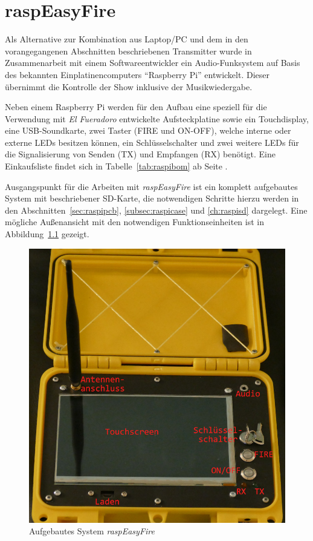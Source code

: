 \documentclass[paper=a4, parskip, numbers=noenddot, toc=listof, headsepline]{scrbook}
\newcommand{\anlage}{\emph{El Fueradoro}}
\newcommand{\REF}{\emph{raspEasyFire}}
\begin{document}
	\chapter{raspEasyFire}

		Als Alternative zur Kombination aus Laptop/PC und dem in den vorangegangenen Abschnitten beschriebenen Transmitter wurde in Zusammenarbeit mit einem Softwareentwickler ein Audio-Funksystem auf Basis des bekannten Einplatinencomputers \enquote{Raspberry Pi} entwickelt. Dieser übernimmt die Kontrolle der Show inklusive der Musikwiedergabe.

		Neben einem Raspberry Pi werden für den Aufbau eine speziell für die Verwendung mit {\anlage} entwickelte Aufsteckplatine sowie ein Touchdisplay, eine USB-Soundkarte, zwei Taster (FIRE und ON-OFF), welche interne oder externe LEDs besitzen können, ein Schlüsselschalter und zwei weitere LEDs für die Signalisierung von Senden (TX) und Empfangen (RX) benötigt. Eine Einkaufsliste findet sich in Tabelle~\ref{tab:raspibom} ab Seite \pageref{tab:raspibom}.

		Ausgangspunkt für die Arbeiten mit {\REF} ist ein komplett aufgebautes System mit beschriebener SD-Karte, die notwendigen Schritte hierzu werden in den Abschnitten~\ref{sec:raspipcb}, \ref{subsec:raspicase} und \ref{ch:raspisd} dargelegt. Eine mögliche Außenansicht mit den notwendigen Funktionseinheiten ist in Abbildung~\ref{fig:raspEasyFireDescription} gezeigt.

		\begin{figure}
			\centering\includegraphics[width=150mm]{Bilder/raspEasyFireDescription}
			\caption{Aufgebautes System \REF}
			\label{fig:raspEasyFireDescription}
		\end{figure}
\end{document}

